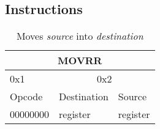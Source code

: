 \documentclass{article}
\begin{document}
\subsection{Instructions}
\begin{table}[h!]
\centering
\begin{tabular} { | p{2cm} | | p{2cm} | p{2cm} |}
  \hline
  \multicolumn{3}{|c|}{MOVRR}\\
  \hline
  0x1 & \multicolumn{2}{|c|}{0x2}\\
  \hline
  Opcode & Destination & Source\\
  00000000 & register & register\\
  \hline
\end{tabular}
\caption{Moves \textit{source} into \textit{destination}}
\end{table}
\end{document}
